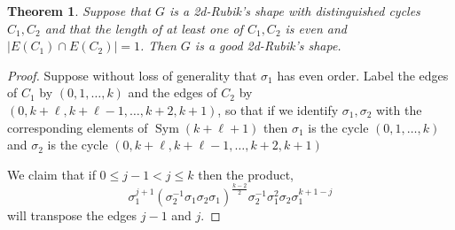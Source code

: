 \documentclass{article}
\DeclareMathOperator{\Sym}{Sym}
\newtheorem{theorem}{Theorem}[section]
\begin{document}
\begin{theorem}
    Suppose that $G$ is a 2d-Rubik's shape with distinguished cycles ${C_1, C_2}$ and that the length of at least one of $C_1, C_2$ is even and $|E(C_1) \cap E(C_2)| = 1$.  Then $G$ is a good 2d-Rubik's shape.
\end{theorem}
\begin{proof}
    Suppose without loss of generality that $\sigma_1$ has even order.
    Label the edges of $C_1$ by $(0, 1, \dots, k)$ and the edges of $C_2$ by $(0, k+\ell, k+\ell-1, \dots, k+2, k+1)$, so that if we identify $\sigma_1, \sigma_2$ with the corresponding elements of $\Sym(k+\ell+1)$ then $\sigma_1$ is the cycle $(0, 1, \dots, k)$ and $\sigma_2$ is the cycle $(0, k+\ell, k+\ell-1, \dots, k+2, k+1)$

    We claim that if $0\leq j-1 < j \leq k$ then the product,
    \[ \sigma_1^{j+1}\left(\sigma_2^{-1}\sigma_1\sigma_2\sigma_1\right)^{\frac{k-2}{2}}\sigma_2^{-1}\sigma_1^2\sigma_2\sigma_1^{k+1-j} \]
    will transpose the edges $j-1$ and $j$.


    \begin{tikzpicture}[x=0.75pt,y=0.75pt,yscale=-1,xscale=1]


\end{tikzpicture}
\end{proof}
\end{document}
